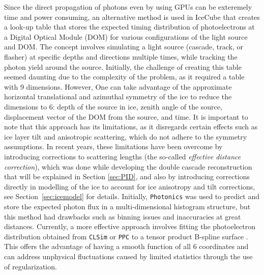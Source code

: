 Since the direct propagation of photons even by using GPUs can be exteremely time and power consuming, an alternative method is used in IceCube that creates a look-up table that stores the expected timing distribution of photoelectrons at a Digital Optical Module (DOM) for various configurations of the light source and DOM. The concept involves simulating a light source (cascade, track, or flasher) at specific depths and directions multiple times, while tracking the photon yield around the source. Initially, the challenge of creating this table seemed daunting due to the complexity of the problem, as it required a table with 9 dimensions. However, One can take advantage of the approximate horizontal translational and azimuthal symmetry of the ice to reduce the dimensions to 6: depth of the source in ice, zenith angle of the source, displacement vector of the DOM from the source, and time. It is important to note that this approach has its limitations, as it disregards certain effects such as ice layer tilt and anisotropic scattering, which do not adhere to the symmetry assumptions. In recent years, these limitations have been overcome by introducing corrections to scattering lengths (the so-called \emph{effective distance correction}), which was done while developing the double cascade reconstruction  that will be explained in Section \ref{sec:PID}, and also by introducing corrections directly in modelling of the ice to account for ice anisotropy and tilt corrections, see Section~\ref{sec:icemodel} for details. Initially, \texttt{Photonics} was used to predict and store the expected photon flux in a multi-dimensional histogram structure, but this method had drawbacks such as binning issues and inaccuracies at great distances. Currently, a more effective approach involves fitting the photoelectron distribution obtained from \texttt{CLSim} or \texttt{PPC} to a tensor product B-spline surface . This offers the advantage of having a smooth function of all 6 coordinates and can address unphysical fluctuations caused by limited statistics through the use of regularization.


